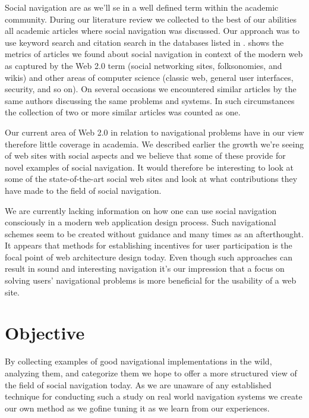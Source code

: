 Social navigation are as we'll se in
a well defined term within the academic community.
During our literature review we collected to the best of our abilities all
academic articles where social navigation was discussed. Our approach was to
use keyword search and citation search in the databases listed in
.%
 shows the metrics of articles
we found about social navigation in context of the modern web as captured by
the Web 2.0 term (social networking sites, folksonomies, and wikis) and other
areas of computer science (classic web, general user interfaces, security, and
so on).
On several occasions we encountered similar articles by the same authors
discussing the same problems and systems. In such circumstances the collection
of two or more similar articles was counted as one.

Our current area of Web 2.0 in relation to navigational problems have in our
view therefore little coverage in academia.
We described earlier the growth we're seeing of web sites with social
aspects and we believe that some of these provide for novel examples of social
navigation. It would therefore be interesting to look at some of the
state-of-the-art social web sites and look at what contributions they have
made to the field of social navigation.

We are currently lacking information on how one can use social navigation
consciously in a modern web application design process. Such navigational
schemes seem to be created without guidance and many times as an afterthought.
It appears that methods for establishing incentives for user participation
is the focal point of web architecture design today. Even though such
approaches can result in sound and interesting navigation it's our impression
that a focus on solving users' navigational problems is more beneficial for
the usability of a web site.

\section{Objective}

By collecting examples of good navigational implementations in the wild,
analyzing them, and categorize them we hope to offer a more structured
view of the field of social navigation today.
As we are unaware of any established technique for
conducting such a study on real world navigation systems we create our own
method as we go\dash{}fine tuning it as we learn from our experiences.

